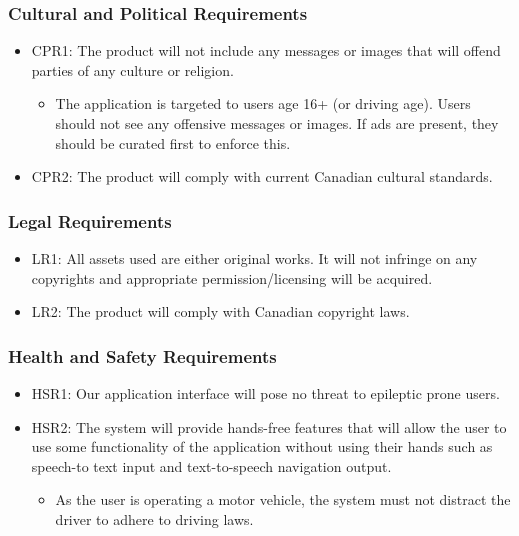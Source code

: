 \documentclass[]{article}
\begin{document}
\subsubsection{Cultural and Political Requirements}
\begin{itemize}
	\item CPR1: The product will not include any messages or images that will offend parties of any culture or religion.
	\begin{itemize}
		\item The application is targeted to users age 16+ (or driving age). Users should not see any offensive messages or images. If ads are present, they should be curated first to enforce this.
	\end{itemize}
	
	\item CPR2: The product will comply with current Canadian cultural standards.
\end{itemize}
\subsubsection{Legal Requirements}
\begin{itemize}
	\item LR1: All assets used are either original works. It will not infringe on any copyrights and appropriate permission/licensing will be acquired.
	\item LR2: The product will comply with Canadian copyright laws.
\end{itemize}

\subsubsection{Health and Safety Requirements}
\begin{itemize}
	\item HSR1: Our application interface will pose no threat to epileptic prone users.
	
	\item HSR2: The system will provide hands-free features that will allow the user to use some functionality of the application without using their hands such as speech-to text input and text-to-speech navigation output.
	\begin{itemize}
		\item As the user is operating a motor vehicle, the system must not distract the driver to adhere to driving laws.
	\end{itemize}
\end{itemize}
\end{document}
